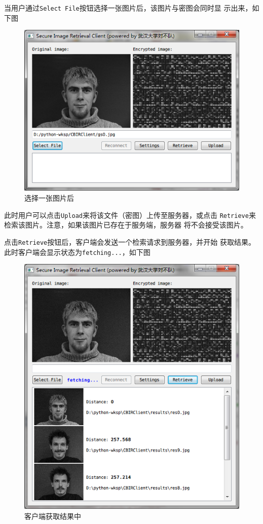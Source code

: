 当用户通过\texttt{Select File}按钮选择一张图片后，该图片与密图会同时显
示出来，如下图

\begin{figure}[H]
  \centering
  \includegraphics[keepaspectratio=true]{images/ui-image-selected.png}
  \caption{选择一张图片后}
  \label{fig:ui-image-selected}
\end{figure}

此时用户可以点击\texttt{Upload}来将该文件（密图）上传至服务器，或点击
\texttt{Retrieve}来检索该图片。注意，如果该图片已存在于服务端，服务器
将不会接受该图片。

点击\texttt{Retrieve}按钮后，客户端会发送一个检索请求到服务器，并开始
获取结果。此时客户端会显示状态为\texttt{fetching...}，如下图

\begin{figure}[H]
  \centering
  \includegraphics[keepaspectratio=true]{images/ui-retrieve-fetching.png}
  \caption{客户端获取结果中}
  \label{fig:ui-retrieve-fetching}
\end{figure}

